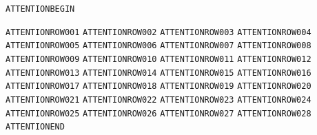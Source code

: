 \clearpage
\begin{AttentionBox}
\texttt{ATTENTIONBEGIN}\par
\texttt{ATTENTIONROW001}\quad\StressParagraph
\texttt{ATTENTIONROW002}\quad\StressParagraph
\texttt{ATTENTIONROW003}\quad\StressParagraph
\texttt{ATTENTIONROW004}\quad\StressParagraph
\texttt{ATTENTIONROW005}\quad\StressParagraph
\texttt{ATTENTIONROW006}\quad\StressParagraph
\texttt{ATTENTIONROW007}\quad\StressParagraph
\texttt{ATTENTIONROW008}\quad\StressParagraph
\texttt{ATTENTIONROW009}\quad\StressParagraph
\texttt{ATTENTIONROW010}\quad\StressParagraph
\texttt{ATTENTIONROW011}\quad\StressParagraph
\texttt{ATTENTIONROW012}\quad\StressParagraph
\texttt{ATTENTIONROW013}\quad\StressParagraph
\texttt{ATTENTIONROW014}\quad\StressParagraph
\texttt{ATTENTIONROW015}\quad\StressParagraph
\texttt{ATTENTIONROW016}\quad\StressParagraph
\texttt{ATTENTIONROW017}\quad\StressParagraph
\texttt{ATTENTIONROW018}\quad\StressParagraph
\texttt{ATTENTIONROW019}\quad\StressParagraph
\texttt{ATTENTIONROW020}\quad\StressParagraph
\texttt{ATTENTIONROW021}\quad\StressParagraph
\texttt{ATTENTIONROW022}\quad\StressParagraph
\texttt{ATTENTIONROW023}\quad\StressParagraph
\texttt{ATTENTIONROW024}\quad\StressParagraph
\texttt{ATTENTIONROW025}\quad\StressParagraph
\texttt{ATTENTIONROW026}\quad\StressParagraph
\texttt{ATTENTIONROW027}\quad\StressParagraph
\texttt{ATTENTIONROW028}\quad\StressParagraph
\texttt{ATTENTIONEND}
\end{AttentionBox}

\clearpage
